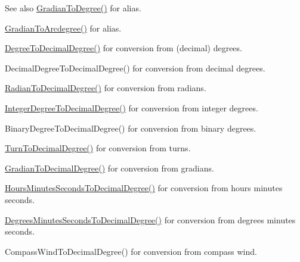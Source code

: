 \begin{DoxySeeAlso}{See also}
\mbox{\hyperlink{group___e_g_x_math-_angle_conversions-_gradian_gaa284952274f16d225951cf5139d0ff4e}{Gradian\+To\+Degree()}} for alias. 

\mbox{\hyperlink{group___e_g_x_math-_angle_conversions-_gradian_gacd0b1797f2460944dcbc541a855ec21c}{Gradian\+To\+Arcdegree()}} for alias. 

\mbox{\hyperlink{group___e_g_x_math-_angle_conversions-_degree_ga568afc1d436d425bf5d4edea584aee08}{Degree\+To\+Decimal\+Degree()}} for conversion from (decimal) degrees. 

Decimal\+Degree\+To\+Decimal\+Degree() for conversion from decimal degrees. 

\mbox{\hyperlink{group___e_g_x_math-_angle_conversions-_radian_ga6d170f1882c32de53167c04524d05f67}{Radian\+To\+Decimal\+Degree()}} for conversion from radians. 

\mbox{\hyperlink{group___e_g_x_math-_angle_conversions-_integer_degree_gac219c3198508ba984d8d81d22831b27d}{Integer\+Degree\+To\+Decimal\+Degree()}} for conversion from integer degrees. 

Binary\+Degree\+To\+Decimal\+Degree() for conversion from binary degrees. 

\mbox{\hyperlink{group___e_g_x_math-_angle_conversions-_turn_ga79231536255e77fb7a158b99a30c1767}{Turn\+To\+Decimal\+Degree()}} for conversion from turns. 

\mbox{\hyperlink{group___e_g_x_math-_angle_conversions-_gradian_ga346f47c519d5261b689cec49f4a8e789}{Gradian\+To\+Decimal\+Degree()}} for conversion from gradians. 

\mbox{\hyperlink{group___e_g_x_math-_angle_conversions-_hours_minutes_seconds_gad6662d1113ae8aea6baca6317888b4cd}{Hours\+Minutes\+Seconds\+To\+Decimal\+Degree()}} for conversion from hours minutes seconds. 

\mbox{\hyperlink{group___e_g_x_math-_angle_conversions-_degrees_minutes_seconds_gab4d4c25623f86611692c39eb29f16141}{Degrees\+Minutes\+Seconds\+To\+Decimal\+Degree()}} for conversion from degrees minutes seconds. 

Compass\+Wind\+To\+Decimal\+Degree() for conversion from compass wind. 
\end{DoxySeeAlso}
\mbox{\label{group___e_g_x_math-_angle_conversions-_gradian_gaa284952274f16d225951cf5139d0ff4e}} 
